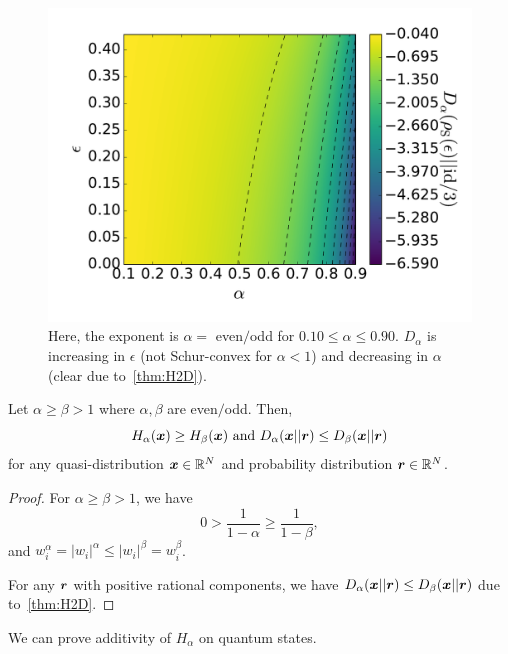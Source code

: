 \documentclass[pra,
aps,
twocolumn,
superscriptaddress,
groupedaddress,
nofootinbib,
reprint
]{revtex4-1}
\begin{document}
\begin{figure}[h]
    \centering
    \includegraphics[scale=0.35]{figs/test/D_test.pdf}
    \caption{Here, the exponent is $\alpha =$ even$/$odd for $0.10 \leq \alpha \leq 0.90$. $D_\alpha$ is increasing in $\epsilon$ (not Schur-convex for $\alpha < 1$) and decreasing in $\alpha$ (clear due to~\cref{thm:H2D}).
    }
    \label{fig:Dtest}
\end{figure}

\begin{lemma}
	Let $\alpha \geq \beta > 1$ where $\alpha, \beta$ are even$/$odd.
	Then,
	\begin{equation}
		H_\alpha(\boldsymbol{x}) \geq H_\beta(\boldsymbol{x}) \text{ and } D_\alpha(\boldsymbol{x} || \boldsymbol{r}) \leq D_\beta(\boldsymbol{x} || \boldsymbol{r})
	\end{equation}
	for any quasi-distribution $\boldsymbol{x} \in \mathbb{R}^N$ and probability distribution $\boldsymbol{r} \in \mathbb{R}^N$.
\end{lemma}
\begin{proof}
	For $\alpha \geq \beta > 1$, we have
	\begin{equation}
		0 > \frac{1}{1-\alpha} \geq \frac{1}{1-\beta},
	\end{equation}
	and $w_i^\alpha = |w_i|^\alpha \leq |w_i|^\beta = w_i^\beta$.
	
	
	For any $\boldsymbol{r}$ with positive rational components, we have $D_\alpha(\boldsymbol{x} || \boldsymbol{r}) \leq D_\beta(\boldsymbol{x} || \boldsymbol{r})$ due to~\cref{thm:H2D}.
\end{proof}

We can prove additivity of $H_{\alpha}$ on quantum states.
\end{document}
